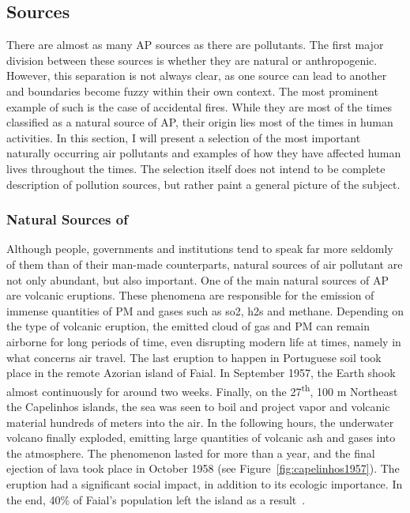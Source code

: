 \subsection{ Sources}%
\label{sub:ap_sources}

There are almost as many \gls{AP} sources as there are pollutants. The
first major division between these sources is whether they are natural
or anthropogenic. However, this separation is not always clear, as one
source can lead to another and boundaries become fuzzy within their own
context. The most prominent example of such is the case of accidental
fires. While they are most of the times classified as a natural source
of \gls{AP}, their origin lies most of the times in human activities. In
this section, I will present a selection of the most important naturally
occurring air pollutants and examples of how they have affected human
lives throughout the times. The selection itself does not intend to be
complete description of pollution sources, but rather paint a general
picture of the subject.

\subsubsection{Natural Sources of }%
\label{ssub:natural_sources_of_ap}

Although people, governments and institutions tend to speak far more
seldomly of them than of their man-made counterparts, natural sources of
air pollutant are not only abundant, but also important. One of the main
natural sources of \gls{AP} are volcanic eruptions. These phenomena are
responsible for the emission of immense quantities of \gls{PM} and gases
such as \gls{so2}, \gls{h2s} and methane. Depending on the type of
volcanic eruption, the emitted cloud of gas and \gls{PM} can remain
airborne for long periods of time, even disrupting modern life at times,
namely in what concerns air travel. The last eruption to happen in
Portuguese soil took place in the remote Azorian island of Faial. In
September 1957, the Earth shook almost continuously for around two
weeks. Finally, on the 27\textsuperscript{th}, 100 m Northeast the
Capelinhos islands, the sea was seen to boil and project vapor and
volcanic material hundreds of meters into the air. In the following
hours, the underwater volcano finally exploded, emitting large
quantities of volcanic ash and gases into the atmosphere. The phenomenon
lasted for more than a year, and the final ejection of lava took place
in October 1958 (see Figure~\ref{fig:capelinhos1957}). The eruption had
a significant social impact, in addition to its ecologic importance. In
the end, 40\% of Faial's population left the island as a
result~\cite{Vallero2014, TSF2017}.


